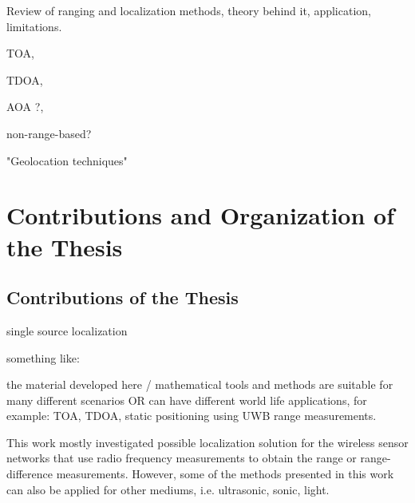 Review of ranging and localization methods, theory behind it, application, limitations. 

TOA,
 
TDOA,

AOA ?,

non-range-based? 

"Geolocation techniques"

\cite{GeoLoc}
\cite{LiuSurvey}


\section{Contributions and Organization of the Thesis}

\subsection{Contributions  of the Thesis} \label{contributions}
single source localization

something like:

the material developed here / mathematical tools and methods are suitable for many different scenarios 
OR
can have different world life applications, for example: TOA, TDOA, static positioning using UWB range measurements. 

This work mostly investigated possible localization solution for the wireless sensor networks that use radio frequency measurements to obtain the range or range-difference measurements. However, some of the methods presented in this work can also be applied for other mediums, i.e. ultrasonic, sonic, light. 

